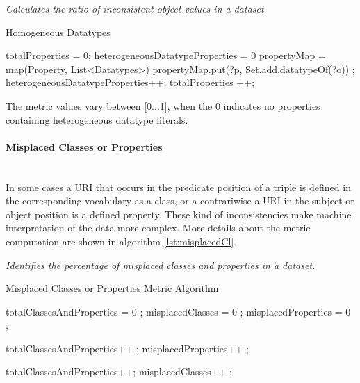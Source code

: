 \begin{mdframed}[style=metricdefinition]
\emph{Calculates the ratio of inconsistent object values in a dataset}
\end{mdframed}

\begin{algorithm}
\caption{Homogeneous Datatypes}\label{lst:heterogeneous}
\begin{algorithmic}[1]
\State totalProperties = 0;
\State heterogeneousDatatypeProperties = 0
\State  propertyMap = map(Property, List<Datatypes>)
\EndProcedure
{}
  propertyMap.put(?p, Set.add.datatypeOf(?o)) \EndIf;
\EndProcedure
{}
 heterogeneousDatatypeProperties++; 
\EndIf
totalProperties ++;
\EndFor
\EndProcedure
\end{algorithmic}
\end{algorithm}

The metric values vary between [0...1], when the 0 indicates no properties containing heterogeneous datatype literals.
  
\paragraph{Misplaced Classes or Properties}~\\
In some cases a URI that occurs in the predicate position of a triple is defined in the corresponding vocabulary as a class, or a contrariwise a URI in the subject or object position is a defined property.
These kind of inconsistencies make machine interpretation of the data more complex.
More details about the metric computation are shown in algorithm \ref{lst:misplacedCl}.

\begin{mdframed}[style=metricdefinition]
\emph{Identifies the percentage of misplaced classes and properties in a dataset.}
\end{mdframed}

\begin{algorithm}
\caption{Misplaced Classes or Properties Metric Algorithm}\label{lst:misplacedCl}
\begin{algorithmic}[1]
\State totalClassesAndProperties = 0 ;
\State misplacedClasses = 0 ;
\State misplacedProperties = 0 ;
\EndProcedure

 totalClassesAndProperties++ ;\EndIf 
{} misplacedProperties++ ; \EndIf 

 totalClassesAndProperties++; \EndIf  
{} misplacedClasses++ ; \EndIf 
{}
\EndProcedure
\end{algorithmic}
\end{algorithm}

